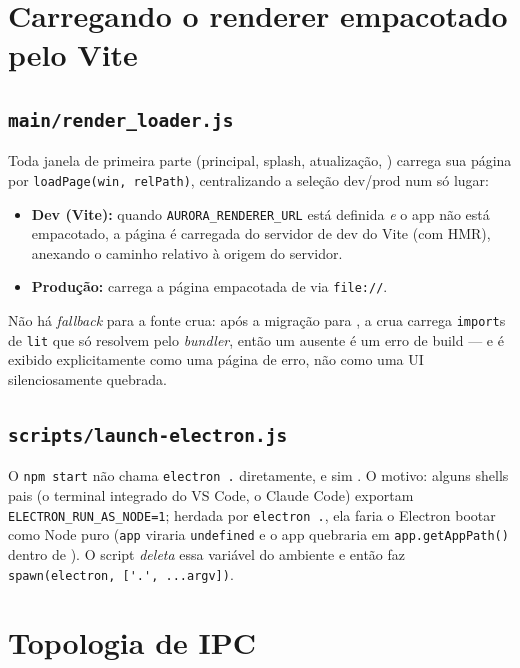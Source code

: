 \section{Carregando o renderer empacotado pelo Vite}
\label{sec:05-render-loader}

\subsection{\texttt{main/render\_loader.js}}

Toda janela de primeira parte (principal, splash, atualização, )
carrega sua página por \lstinline|loadPage(win, relPath)|, centralizando a
seleção dev/prod num só lugar:

\begin{itemize}[leftmargin=*]
  \item \textbf{Dev (Vite):} quando \lstinline|AURORA_RENDERER_URL| está definida
    \emph{e} o app não está empacotado, a página é carregada do servidor de dev do
    Vite (com HMR), anexando o caminho relativo à origem do servidor.
  \item \textbf{Produção:} carrega a página empacotada de  via
    \lstinline|file://|.
\end{itemize}

Não há \emph{fallback} para a fonte crua: após a migração para , a
 crua carrega \lstinline|import|s de \lstinline|lit| que só
resolvem pelo \emph{bundler}, então um  ausente é um erro de build
--- e é exibido explicitamente como uma página de erro, não como uma UI
silenciosamente quebrada.

\subsection{\texttt{scripts/launch-electron.js}}

O \lstinline|npm start| não chama \lstinline|electron .| diretamente, e sim
. O motivo: alguns shells pais (o terminal
integrado do VS Code, o Claude Code) exportam
\lstinline|ELECTRON_RUN_AS_NODE=1|; herdada por \lstinline|electron .|, ela faria
o Electron bootar como Node puro (\lstinline|app| viraria \lstinline|undefined| e
o app quebraria em \lstinline|app.getAppPath()| dentro de ). O
script \emph{deleta} essa variável do ambiente e então faz
\lstinline|spawn(electron, ['.', ...argv])|.

\section{Topologia de IPC}
\label{sec:05-ipc}

